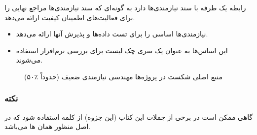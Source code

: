 رابطه یک طرفه با سند نیازمندی‌ها دارد به گونه‌ای که سند نیازمندی‌ها مراجع نهایی
را برای فعالیت‌های اطمینان کیفیت ارائه می‌دهد.

\begin{itemize}
    \item نیازمندی‌ها اساسی را برای تست داده‌ها و پذیرش آنها ارائه می‌دهد.
    \item این اساس‌ها به عنوان یک سری چک لیست برای بررسی نرم‌افزار استفاده
    می‌شوند.
\end{itemize}





\begin{figure}[H]
    \centering
    \caption{منبع اصلی شکست در پروژه‌ها مهندسی نیازمندی ضعیف (حدوداً ٪۵۰)}
    \label{fig: poorRE}
\end{figure}

\subsubsection*{نکته}

گاهی ممکن است در برخی از جملات این کتاب (این جزوه) از کلمه 
استفاده شود که در اصل منظور همان ها می‌باشد.